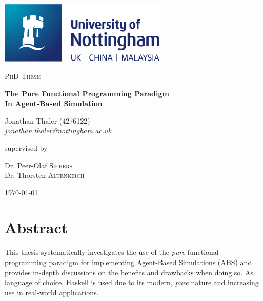 \documentclass[oneside]{book}
\begin{document}
\begin{titlepage}
	\centering
	\includegraphics[width=0.60\textwidth]{./logo/UoN_Primary_Logo_RGB.png}\par\vspace{1cm}
	{\scshape\Large PhD Thesis\par}
	\vspace{1.5cm}
	{\huge\bfseries The Pure Functional Programming Paradigm \\ In Agent-Based Simulation \par}
	\vspace{2cm}
	{\Large Jonathan Thaler (4276122) \\ \itshape jonathan.thaler@nottingham.ac.uk \par}
	\vfill
	supervised by\par
	Dr. Peer-Olaf \textsc{Siebers} \\
	Dr. Thorsten \textsc{Altenkirch}

	\vfill

	{\large \today\par}
\end{titlepage}

\cleardoublepage

\section*{Abstract}
This thesis systematically investigates the use of the \textit{pure} functional programming paradigm for implementing Agent-Based Simulations (ABS) and provides in-depth discussions on the benefits and drawbacks when doing so. As language of choice, Haskell is used due to its modern, \textit{pure} nature and increasing use in real-world applications. 
\end{document}
